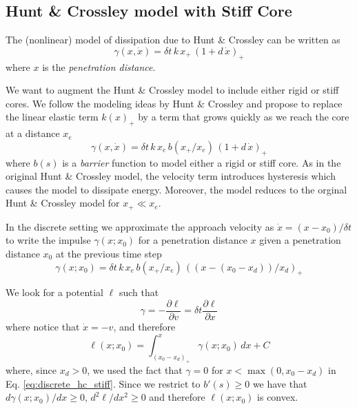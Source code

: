 \subsection{Hunt \& Crossley model with Stiff Core}
The (nonlinear) model of dissipation due to Hunt \& Crossley
\cite{bib:hunt_crossley} can be written as 
\begin{equation}
    \gamma(x,\dot{x}) = \delta t\,k\,x_+\,(1+d\,\dot{x})_+
\end{equation}
where $x$ is the \emph{penetration distance}.

We want to augment the Hunt \& Crossley model to include either rigid or stiff
cores. We follow the modeling ideas by Hunt \& Crossley \cite{bib:hunt_crossley}
and propose to replace the linear elastic term $k(x)_+$ by a term that grows
quickly as we reach the core at a distance $x_e$
\begin{equation}
    \gamma(x, \dot{x}) = \delta t\,k\,x_e\,b(x_+/x_e)\,(1+d\,\dot{x})_+
\end{equation}
where $b(s)$ is a \emph{barrier} function to model either a rigid or stiff core.
As in the original Hunt \& Crossley model, the velocity term introduces
hysteresis which causes the model to dissipate energy. Moreover, the model
reduces to the orginal Hunt \& Crossley model for $x_+ \ll x_e$.

In the discrete setting we approximate the approach velocity as $\dot{x} =
(x-x_0)/\delta t$ to write the impulse $\gamma(x; x_0)$ for a penetration
distance $x$ given a penetration distance $x_0$ at the previous time step
\begin{equation}
    \gamma(x; x_0) = \delta t\,k\,x_e\,b(x_+/x_e)\,((x-(x_0-x_d))/x_d)_+
    \label{eq:discrete_hc_stiff}
\end{equation}

We look for a potential $\ell$ such that
\begin{equation}
    \gamma = -\frac{\partial\ell}{\partial v} = \delta t\frac{\partial\ell}{\partial x}
\end{equation}
where notice that $\dot{x}=-v$, and therefore
\begin{equation}
    \ell(x; x_0) = \int_{(x_0-x_d)_+}^{x}\gamma(x; x_0)\,dx + C
\end{equation}
where, since $x_d>0$, we used the fact that $\gamma=0$ for $x < \max(0,
x_0-x_d)$ in Eq. \eqref{eq:discrete_hc_stiff}. Since we restrict to $b'(s) \ge 0$ we
have that $d\gamma(x;x_0)/dx\ge 0$, $d^2\ell/dx^2 \ge 0$ and therefore $\ell(x;
x_0)$ is convex.

